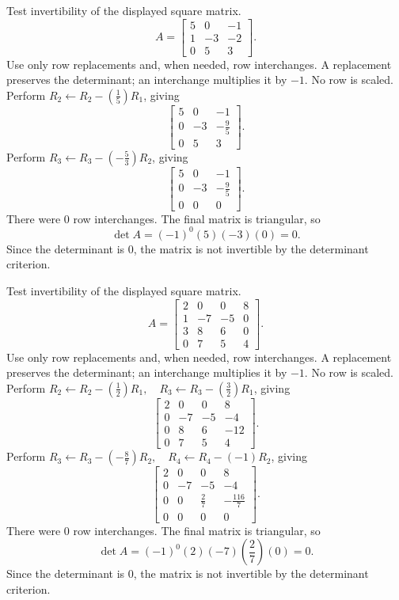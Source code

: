 \goal Test invertibility of the displayed square matrix.
\[A=\begin{bmatrix}5&0&-1\\1&-3&-2\\0&5&3\end{bmatrix}.\]
Use only row replacements and, when needed, row interchanges. A replacement preserves the determinant; an interchange multiplies it by $-1$. No row is scaled.
Perform $R_2\leftarrow R_2-(\frac{1}{5})R_1$, giving
\[
\begin{bmatrix}5&0&-1\\0&-3&- \frac{9}{5}\\0&5&3\end{bmatrix}.
\]
Perform $R_3\leftarrow R_3-(- \frac{5}{3})R_2$, giving
\[
\begin{bmatrix}5&0&-1\\0&-3&- \frac{9}{5}\\0&0&0\end{bmatrix}.
\]
There were $0$ row interchanges. The final matrix is triangular, so
\[\det A=(-1)^{0}(5)(-3)(0)=0.\]
Since the determinant is $0$, the matrix is not invertible by the determinant criterion.

\goal Test invertibility of the displayed square matrix.
\[A=\begin{bmatrix}2&0&0&8\\1&-7&-5&0\\3&8&6&0\\0&7&5&4\end{bmatrix}.\]
Use only row replacements and, when needed, row interchanges. A replacement preserves the determinant; an interchange multiplies it by $-1$. No row is scaled.
Perform $R_2\leftarrow R_2-(\frac{1}{2})R_1,\quad R_3\leftarrow R_3-(\frac{3}{2})R_1$, giving
\[
\begin{bmatrix}2&0&0&8\\0&-7&-5&-4\\0&8&6&-12\\0&7&5&4\end{bmatrix}.
\]
Perform $R_3\leftarrow R_3-(- \frac{8}{7})R_2,\quad R_4\leftarrow R_4-(-1)R_2$, giving
\[
\begin{bmatrix}2&0&0&8\\0&-7&-5&-4\\0&0&\frac{2}{7}&- \frac{116}{7}\\0&0&0&0\end{bmatrix}.
\]
There were $0$ row interchanges. The final matrix is triangular, so
\[\det A=(-1)^{0}(2)(-7)(\frac{2}{7})(0)=0.\]
Since the determinant is $0$, the matrix is not invertible by the determinant criterion.

